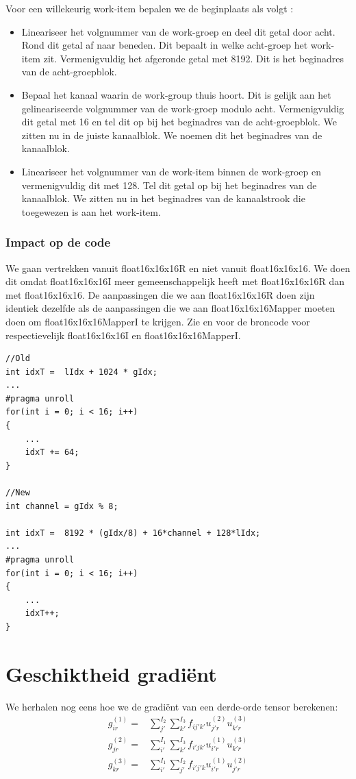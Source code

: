 Voor een willekeurig work-item bepalen we de beginplaats als volgt :
\begin{itemize}
    \item Lineariseer het volgnummer van de work-groep en deel dit getal door acht. Rond dit getal af naar beneden. Dit bepaalt in welke acht-groep het work-item zit. Vermenigvuldig het afgeronde getal met 8192. Dit is het beginadres van de acht-groepblok.
    \item Bepaal het kanaal waarin de work-group thuis hoort. Dit is gelijk aan het gelineariseerde volgnummer van de work-groep modulo acht. Vermenigvuldig dit getal met 16 en tel dit op bij het beginadres van de acht-groepblok. We zitten nu in de juiste kanaalblok. We noemen dit het beginadres van de kanaalblok.
    \item Lineariseer het volgnummer van de work-item binnen de work-groep en vermenigvuldig dit met 128. Tel dit getal op bij het beginadres van de kanaalblok. We zitten nu in het beginadres van de kanaalstrook die toegewezen is aan het work-item.
\end{itemize}

\subsubsection{Impact op de code}
We gaan vertrekken vanuit float16x16x16R en niet vanuit float16x16x16. We doen dit omdat  float16x16x16I meer gemeenschappelijk heeft met  float16x16x16R dan met float16x16x16. De aanpassingen die we aan float16x16x16R doen zijn identiek dezelfde als de aanpassingen die we aan float16x16x16Mapper moeten doen om float16x16x16MapperI te krijgen. Zie  en  voor de broncode voor respectievelijk float16x16x16I en float16x16x16MapperI.

\begin{lstlisting}
//Old
int idxT =  lIdx + 1024 * gIdx;
...
#pragma unroll
for(int i = 0; i < 16; i++)
{
	...
	idxT += 64;
}

//New
int channel = gIdx % 8;

int idxT =  8192 * (gIdx/8) + 16*channel + 128*lIdx; 
...
#pragma unroll
for(int i = 0; i < 16; i++)
{
	...
	idxT++;
}
\end{lstlisting}

\section{Geschiktheid gradi\"ent}
We herhalen nog eens hoe we de gradi\"ent van een derde-orde tensor berekenen:
\begin{align*}
    g^{(1)}_{ir} =& \sum_{j'}^{I_2}\sum_{k'}^{I_3} f_{ij'k'} u^{(2)}_{j'r} u^{(3)}_{k'r}\\
    g^{(2)}_{jr} =& \sum_{i'}^{I_1}\sum_{k'}^{I_3} f_{i'jk'} u^{(1)}_{i'r} u^{(3)}_{k'r}\\
    g^{(3)}_{kr} =& \sum_{i'}^{I_1}\sum_{j'}^{I_2} f_{i'j'k} u^{(1)}_{i'r} u^{(2)}_{j'r}\\
\end{align*}

